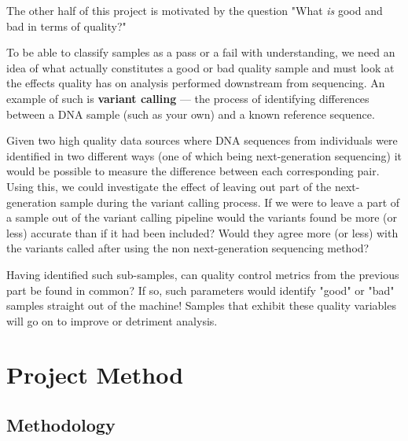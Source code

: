 The other half of this project is motivated by the question "What \textit{is}
good and bad in terms of quality?"

To be able to classify samples as a pass or a fail with understanding, we need
an idea of what actually constitutes a good or bad quality sample and must look
at the effects quality has on analysis performed downstream from sequencing.
An example of such is \textbf{variant calling} --- the process of identifying
differences between a DNA sample (such as your own) and a known reference
sequence.

Given two high quality data sources where DNA sequences from individuals were
identified in two different ways (one of which being next-generation sequencing)
it would be possible to measure the difference between each corresponding pair.
Using this, we could investigate the effect of leaving out part of the
next-generation sample during the variant calling process.
If we were to leave a part of a sample out of the variant calling
pipeline would the variants found be more (or less) accurate than if it had been
included? Would they agree more (or less) with the variants called after using
the non next-generation sequencing method?

Having identified such sub-samples, can quality control metrics from the
previous part be found in common? If so, such parameters would identify "good"
or "bad" samples straight out of the machine! Samples that exhibit these quality
variables will go on to improve or detriment analysis.


\section{Project Method}
\subsection{Methodology}
\label{chap:methodology}

